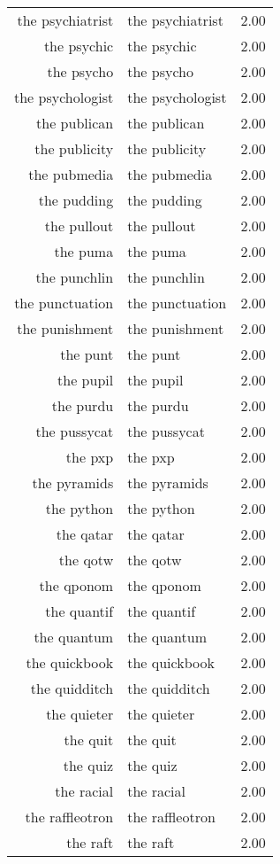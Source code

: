 \begin{table}[ht]
\begin{tabular}{rlr}
  the psychiatrist & the psychiatrist & 2.00 \\ 
  the psychic & the psychic & 2.00 \\ 
  the psycho & the psycho & 2.00 \\ 
  the psychologist & the psychologist & 2.00 \\ 
  the publican & the publican & 2.00 \\ 
  the publicity & the publicity & 2.00 \\ 
  the pubmedia & the pubmedia & 2.00 \\ 
  the pudding & the pudding & 2.00 \\ 
  the pullout & the pullout & 2.00 \\ 
  the puma & the puma & 2.00 \\ 
  the punchlin & the punchlin & 2.00 \\ 
  the punctuation & the punctuation & 2.00 \\ 
  the punishment & the punishment & 2.00 \\ 
  the punt & the punt & 2.00 \\ 
  the pupil & the pupil & 2.00 \\ 
  the purdu & the purdu & 2.00 \\ 
  the pussycat & the pussycat & 2.00 \\ 
  the pxp & the pxp & 2.00 \\ 
  the pyramids & the pyramids & 2.00 \\ 
  the python & the python & 2.00 \\ 
  the qatar & the qatar & 2.00 \\ 
  the qotw & the qotw & 2.00 \\ 
  the qponom & the qponom & 2.00 \\ 
  the quantif & the quantif & 2.00 \\ 
  the quantum & the quantum & 2.00 \\ 
  the quickbook & the quickbook & 2.00 \\ 
  the quidditch & the quidditch & 2.00 \\ 
  the quieter & the quieter & 2.00 \\ 
  the quit & the quit & 2.00 \\ 
  the quiz & the quiz & 2.00 \\ 
  the racial & the racial & 2.00 \\ 
  the raffleotron & the raffleotron & 2.00 \\ 
  the raft & the raft & 2.00 \\ 

\end{tabular}
\end{table}
